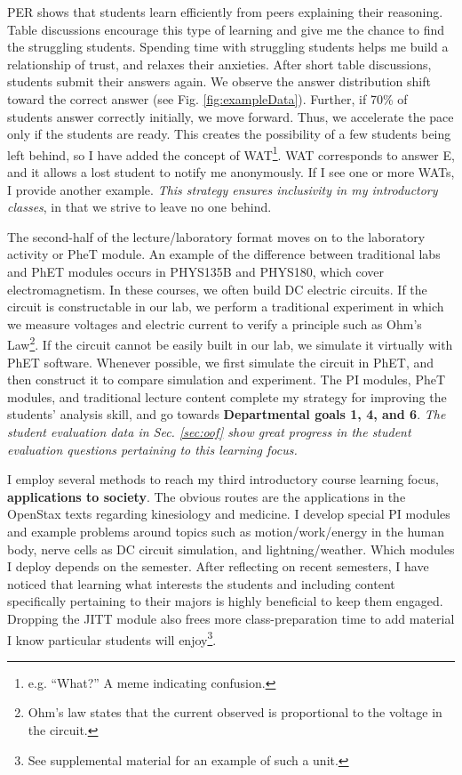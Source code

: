 \documentclass[../../../main.tex]{subfiles}
\begin{document}
PER shows that students learn efficiently from peers explaining their reasoning.  Table discussions encourage this type of learning and  give me the chance to find the struggling students. Spending time with struggling students helps me build a relationship of trust, and relaxes their anxieties.  After short table discussions, students submit their answers again.  We observe the answer distribution shift toward the correct answer (see Fig. \ref{fig:exampleData}).  Further, if 70\% of students answer correctly initially, we move forward.  Thus, we accelerate the pace only if the students are ready.  This creates the possibility of a few students being left behind, so I have added the concept of WAT\footnote{e.g. ``What?'' A meme indicating confusion.}.  WAT corresponds to answer E, and it allows a lost student to notify me anonymously.  If I see one or more WATs, I provide another example.  \textit{This strategy ensures inclusivity in my introductory classes}, in that we strive to leave no one behind.  \\ \hspace{0.1cm}

The second-half of the lecture/laboratory format moves on to the laboratory activity or PheT module.  An example of the difference between traditional labs and PhET modules occurs in PHYS135B and PHYS180, which cover electromagnetism.  In these courses, we often build DC electric circuits.  If the circuit is constructable in our lab, we perform a traditional experiment in which we measure voltages and electric current to verify a principle such as Ohm's Law\footnote{Ohm's law states that the current observed is proportional to the voltage in the circuit.}.  If the circuit cannot be easily built in our lab, we simulate it virtually with PhET software.  Whenever possible, we first simulate the circuit in PhET, and then construct it to compare simulation and experiment.  The PI modules, PheT modules, and traditional lecture content complete my strategy for improving the students' analysis skill, and go towards \textbf{Departmental goals 1, 4, and 6}.  \textit{The student evaluation data in Sec. \ref{sec:oof} show great progress in the student evaluation questions pertaining to this learning focus.} \\ \hspace{0.1cm}

I employ several methods to reach my third introductory course learning focus, \textbf{applications to society}.  The obvious routes are the applications in the OpenStax texts \cite{openstax1} regarding kinesiology and medicine.  I develop special PI modules and example problems around topics such as motion/work/energy in the human body, nerve cells as DC circuit simulation, and lightning/weather.  Which modules I deploy depends on the semester.  After reflecting on recent semesters, I have noticed that learning what interests the students and including content specifically pertaining to their majors is highly beneficial to keep them engaged.  Dropping the JITT module also frees more class-preparation time to add material I know particular students will enjoy\footnote{See supplemental material for an example of such a unit.}. \\ \hspace{0.1cm}
\end{document}
